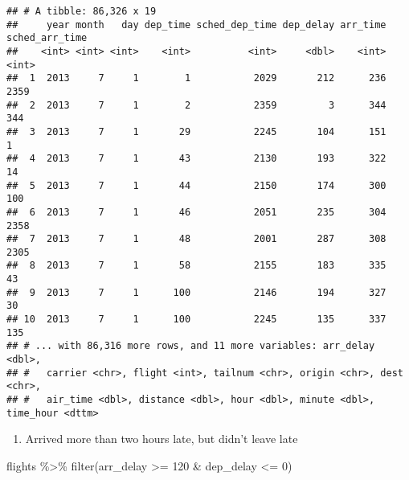 \documentclass[
]{article}
\newenvironment{Shaded}{\begin{snugshade}}{\end{snugshade}}
\newcommand{\DecValTok}[1]{\textcolor[rgb]{0.00,0.00,0.81}{#1}}
\newcommand{\FunctionTok}[1]{\textcolor[rgb]{0.00,0.00,0.00}{#1}}
\newcommand{\NormalTok}[1]{#1}
\newcommand{\SpecialCharTok}[1]{\textcolor[rgb]{0.00,0.00,0.00}{#1}}
\providecommand{\tightlist}{%
  \setlength{\itemsep}{0pt}\setlength{\parskip}{0pt}}
\begin{document}
\begin{verbatim}
## # A tibble: 86,326 x 19
##     year month   day dep_time sched_dep_time dep_delay arr_time sched_arr_time
##    <int> <int> <int>    <int>          <int>     <dbl>    <int>          <int>
##  1  2013     7     1        1           2029       212      236           2359
##  2  2013     7     1        2           2359         3      344            344
##  3  2013     7     1       29           2245       104      151              1
##  4  2013     7     1       43           2130       193      322             14
##  5  2013     7     1       44           2150       174      300            100
##  6  2013     7     1       46           2051       235      304           2358
##  7  2013     7     1       48           2001       287      308           2305
##  8  2013     7     1       58           2155       183      335             43
##  9  2013     7     1      100           2146       194      327             30
## 10  2013     7     1      100           2245       135      337            135
## # ... with 86,316 more rows, and 11 more variables: arr_delay <dbl>,
## #   carrier <chr>, flight <int>, tailnum <chr>, origin <chr>, dest <chr>,
## #   air_time <dbl>, distance <dbl>, hour <dbl>, minute <dbl>, time_hour <dttm>
\end{verbatim}

\begin{enumerate}
\def\labelenumi{\arabic{enumi}.}
\setcounter{enumi}{4}
\tightlist
\item
  Arrived more than two hours late, but didn't leave late
\end{enumerate}

\begin{Shaded}
\begin{Highlighting}[]
\NormalTok{flights }\SpecialCharTok{\%\textgreater{}\%} \FunctionTok{filter}\NormalTok{(arr\_delay }\SpecialCharTok{\textgreater{}=} \DecValTok{120} \SpecialCharTok{\&}\NormalTok{ dep\_delay }\SpecialCharTok{\textless{}=} \DecValTok{0}\NormalTok{)}
\end{Highlighting}
\end{Shaded}
\end{document}

